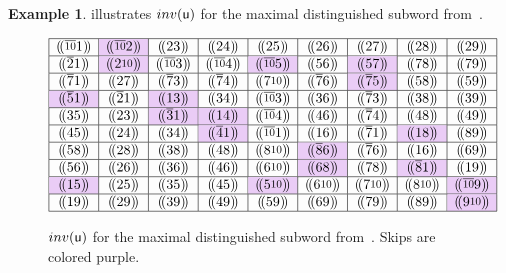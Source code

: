 \documentclass[a4paper,10pt,leqno]{amsart}
\numberwithin{equation}{section}
\theoremstyle{definition}
\newtheorem{example}[theorem]{Example}
\theoremstyle{remark}
\renewcommand{\u}{\mathsf{u}}
\newcommand{\Inv}{\textsc{inv}}
\newcommand\cd{\cellcolor{darkred!20}}
\newcommand\ten{\raisebox{.15\height}{\scalebox{.8}{10}}}
\begin{document}
\begin{example}
 illustrates $\Inv(\u)$ for the maximal distinguished subword from~.
\end{example}

\begin{figure}[htbp]
\[\begin{array}{|c|c|c|c|c|c|c|c|c|} \hline (\!(\overline{\ten}1)\!)& \cd (\!(\overline{\ten}2)\!)&  (\!(23)\!)&  (\!(24)\!)&  (\!(25)\!)&  (\!(26)\!)&  (\!(27)\!)&  (\!(28)\!)&  (\!(29)\!)
\\ \hline (\!(\overline{2}1)\!)& \cd (\!(2\ten)\!)&  (\!(\overline{\ten}3)\!)&  (\!(\overline{\ten}4)\!)& \cd (\!(\overline{\ten}5)\!)&  (\!(56)\!)& \cd (\!(57)\!)&  (\!(78)\!)&  (\!(79)\!)
\\ \hline (\!(\overline{7}1)\!)&  (\!(27)\!)&  (\!(\overline{7}3)\!)&  (\!(\overline{7}4)\!)&  (\!(7\ten)\!)&  (\!(\overline{7}6)\!)& \cd (\!(\overline{7}5)\!)&  (\!(58)\!)&  (\!(59)\!)
\\ \hline\cd (\!(\overline{5}1)\!)&  (\!(\overline{2}1)\!)& \cd (\!(13)\!)&  (\!(34)\!)&  (\!(\overline{\ten}3)\!)&  (\!(36)\!)&  (\!(\overline{7}3)\!)&  (\!(38)\!)&  (\!(39)\!)
\\ \hline (\!(35)\!)&  (\!(23)\!)& \cd (\!(\overline{3}1)\!)& \cd (\!(14)\!)&  (\!(\overline{\ten}4)\!)&  (\!(46)\!)&  (\!(\overline{7}4)\!)&  (\!(48)\!)&  (\!(49)\!)
\\ \hline (\!(45)\!)&  (\!(24)\!)&  (\!(34)\!)& \cd (\!(\overline{4}1)\!)&  (\!(\overline{\ten}1)\!)&  (\!(16)\!)&  (\!(\overline{7}1)\!)& \cd (\!(18)\!)&  (\!(89)\!)
\\ \hline (\!(58)\!)&  (\!(28)\!)&  (\!(38)\!)&  (\!(48)\!)&  (\!(8\ten)\!)& \cd (\!(\overline{8}6)\!)&  (\!(\overline{7}6)\!)&  (\!(16)\!)&  (\!(69)\!)
\\ \hline (\!(56)\!)&  (\!(26)\!)&  (\!(36)\!)&  (\!(46)\!)&  (\!(6\ten)\!)& \cd (\!(68)\!)&  (\!(78)\!)& \cd (\!(\overline{8}1)\!)&  (\!(19)\!)
\\ \hline\cd (\!(15)\!)&  (\!(25)\!)&  (\!(35)\!)&  (\!(45)\!)& \cd (\!(5\ten)\!)&  (\!(6\ten)\!)&  (\!(7\ten)\!)&  (\!(8\ten)\!)& \cd (\!(\overline{\ten}9)\!)
\\ \hline (\!(19)\!)&  (\!(29)\!)&  (\!(39)\!)&  (\!(49)\!)&  (\!(59)\!)&  (\!(69)\!)&  (\!(79)\!)&  (\!(89)\!)& \cd (\!(9\ten)\!)\\ \hline \end{array}\]
\caption{$\Inv(\u)$ for the maximal distinguished subword from~.  Skips are colored purple.}
\label{fig:invs}
\end{figure}
\end{document}
